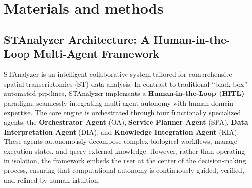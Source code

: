 \documentclass[11pt,a4paper]{article}
\begin{document}
\section{Materials and methods}

\subsection{STAnalyzer Architecture: A Human-in-the-Loop Multi-Agent Framework}
STAnalyzer is an intelligent collaborative system tailored for comprehensive spatial transcriptomics (ST) data analysis. In contrast to traditional ``black-box'' automated pipelines, STAnalyzer implements a \textbf{Human-in-the-Loop (HITL)} paradigm, seamlessly integrating multi-agent autonomy with human domain expertise. The core engine is orchestrated through four functionally specialized agents: the \textbf{Orchestrator Agent} (OA), \textbf{Service Planner Agent} (SPA), \textbf{Data Interpretation Agent} (DIA), and \textbf{Knowledge Integration Agent} (KIA). These agents autonomously decompose complex biological workflows, manage execution states, and query external knowledge. However, rather than operating in isolation, the framework embeds the user at the center of the decision-making process, ensuring that computational autonomy is continuously guided, verified, and refined by human intuition.
\end{document}
